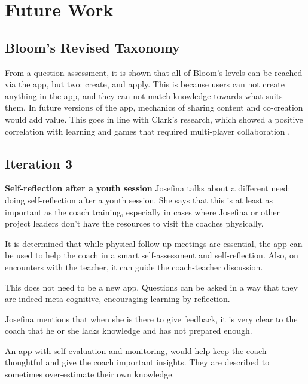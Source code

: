 \section{Future Work}

\subsection{Bloom's Revised Taxonomy}

From a question assessment, it is shown that all of Bloom's levels can be reached via the app, but two: create, and apply. This is because users can not create anything in the app, and they can not match knowledge towards what suits them. In future versions of the app, mechanics of sharing content and co-creation would add value. This goes in line with Clark's research, which showed a positive correlation with learning and games that required multi-player collaboration \citep{gates}.

\subsection{Iteration 3}

\textbf{Self-reflection after a youth session}
Josefina talks about a different need: doing self-reflection after a youth session. She says that this is at least as important as the coach training, especially in cases where Josefina or other project leaders don't have the resources to visit the coaches physically.

It is determined that while physical follow-up meetings are essential, the app can be used to help the coach in a smart self-assessment and self-reflection. Also, on encounters with the teacher, it can guide the coach-teacher discussion.

This does not need to be a new app. Questions can be asked in a way that they are indeed meta-cognitive, encouraging learning by reflection.

Josefina mentions that when she is there to give feedback, it is very clear to the coach that he or she lacks knowledge and has not prepared enough.

An app with self-evaluation and monitoring, would help keep the coach thoughtful and give the coach important insights. They are described to sometimes over-estimate their own knowledge.

